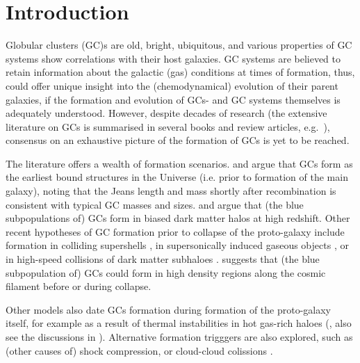 \documentclass[a4paper,fleqn,usenatbib]{mnras}
\begin{document}


\section{Introduction}
Globular clusters (GC)s are old, bright, ubiquitous, and various properties of
GC systems show correlations with their host galaxies. GC systems are believed to
retain information about the galactic (gas) conditions at times of formation,
thus, could offer unique insight into the (chemodynamical) evolution of their 
parent galaxies, if the formation and evolution of GCs- and GC systems themselves 
is adequately understood. However, despite decades of research (the extensive 
literature on GCs is summarised in several books and review articles, e.g.~\citealt{
1991ARA&A..29..543H, Harris2001, 2004Natur.427...31W, 2006ARA&A..44..193B, 
2012A&ARv..20...50G, 2014CQGra..31x4006K, 2018RSPSA.47470616F}), consensus on an 
exhaustive picture of the formation of GCs is yet to be reached.

The literature offers a wealth of formation scenarios. \citet{1968ApJ...154..891P}
and \citet{1984ApJ...277..470P} argue that GCs form as the earliest bound
structures in the Universe (i.e. prior to formation of the main galaxy), 
noting that the Jeans length and mass shortly after recombination is consistent
with typical GC masses and sizes. \citet{2005MNRAS.364..367D} and \citet{
2009ApJ...706L.192B} argue that (the blue subpopulations of) GCs form in biased 
dark matter halos at high redshift. Other recent hypotheses of GC formation prior 
to collapse of the proto-galaxy include formation in colliding supershells 
\citep{2017Ap&SS.362..183R}, in supersonically induced gaseous objects
\citep{2019arXiv190408941C}, or in high-speed collisions of dark matter subhaloes
\citep{2019arXiv190508951M}. \citet{2017MNRAS.472.3120B} suggests
that (the blue subpopulation of) GCs could form in high density regions along
the cosmic filament before or during collapse.

Other models also date GCs formation during formation of the proto-galaxy itself,
for example as a result of thermal instabilities in hot gas-rich haloes 
(\citealt{1985ApJ...298...18F}, also see the discussions in \citealt{
1990ApJ...363..488K}). Alternative formation trigggers are also explored, such as 
(other causes of) shock compression, or cloud-cloud colissions \citep[e.g.][]{
1980glcl.conf..301G, 1992ApJ...400..265M, 1994ApJ...429..177H, 1995ApJ...442..618V,
1996ASPC...92..241L, 2001ApJ...560..592C}. 
\end{document}
